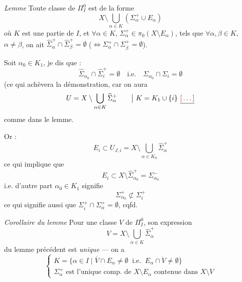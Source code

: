 \documentclass[11pt,a4paper]{article}
\begin{document}
\emph{Lemme} Toute classe de $\Pi_I^0$ est de la forme
\[
X\setminus\bigcup_{\alpha\in K}(\Sigma_\alpha^+\cup E_\alpha)
\]
où $K$ est une partie  de $I$, et
$\forall\alpha\in K$, \struck{\ill{}}
$\Sigma_\alpha^+\in\pi_0(X\setminus E_\alpha)$, tels que
$\forall\alpha,\beta\in K$, $\alpha\neq\beta$, on ait
$\widehat{\Sigma}_\alpha^+\cap\widehat{\Sigma}_\beta^+=\emptyset$
($\Longleftrightarrow \Sigma_\alpha^+\cap\Sigma_\beta^+=\emptyset$).

Soit $\alpha_0\in K_1$, je dis que  :
\[
\widehat{\Sigma}_{\alpha_0}\cap\widehat{\Sigma}_i^+ = \emptyset \quad
\text{i.e.}\quad \Sigma_{\alpha_0}\cap\Sigma_i = \emptyset
\]
(ce qui achèvera la démonstration, car on aura
\[
U = X\setminus\bigcup_{\alpha\in K}\widehat{\Sigma}_\alpha^+ \qquad
\bigl|\ K = K_1\cup\{i\}\ \struck{\ill{}}
\]
comme dans le lemme.

Or \struck{\ill{}} \ill{} :
\[
E_i\subset U_{J,i} = X\setminus\bigcup_{\alpha\in K_0}
\widehat{\Sigma}_\alpha^+
\]
ce qui implique que
\[
E_i\subset X\setminus\widehat{\Sigma}_{\alpha_0}^+ = \Sigma_{\alpha_0}^-
\]
i.e.
d'autre part $\alpha_0\in K_1$ signifie
\[
\Sigma_{\alpha_0}^+\not\subset\Sigma_i^+
\]
ce qui  signifie aussi que
$\Sigma_i^+\cap\Sigma_\alpha^+=\emptyset$, cqfd.

\emph{Corollaire du lemme} Pour une classe $V$ de $\Pi_I^0$, son
expression
\[
V = X\setminus\bigcup_{\alpha\in K}\widehat{\Sigma}_\alpha^+
\]
du lemme précédent est \emph{unique} — on a
\[
\begin{cases}
K = \{\alpha\in I \mid \overline{V}\cap E_\alpha\neq\emptyset \ \text{ i.e. }\ E_\alpha\cap\dot{V}\neq\emptyset\}\\
\Sigma_\alpha^+ \text{ est l'unique comp.\ de } X\setminus E_\alpha
\text{ contenue dans } X\setminus V
\end{cases}
\]
\end{document}
